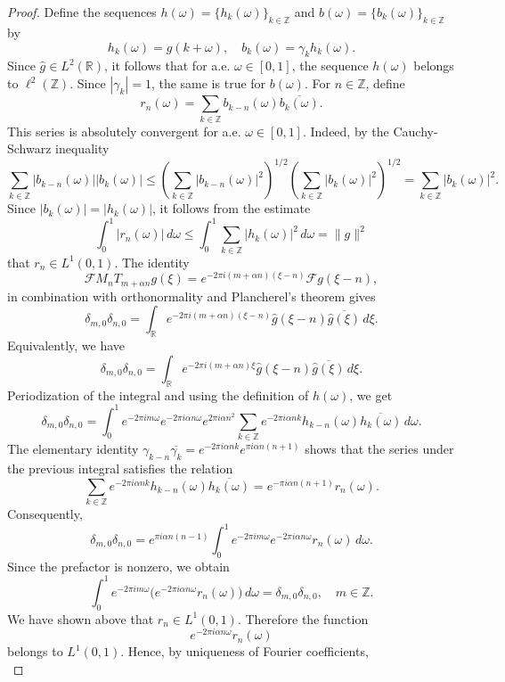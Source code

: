 \documentclass[10pt,a4paper]{amsart}
\def\Z{{\mathbb Z}}
\newcommand{\ft}{{\mathcal{F}}}
\begin{document}
\begin{proof}
Define the sequences $h(\omega)=\{h_k(\omega)\}_{k\in\Z}$ and $b(\omega)=\{b_k(\omega)\}_{k\in\Z}$ by
$$
h_k(\omega)=\widehat g(k+\omega), \quad b_k(\omega)=\gamma_k h_k(\omega).
$$
Since $\widehat g\in L^2(\mathbb R)$, it follows that for a.e. $\omega \in [0,1]$, the sequence $h(\omega)$ belongs to $\ell^2(\Z)$. Since $|\gamma_k|=1$, the same is true for $b(\omega)$.
For $n\in\mathbb Z$, define
$$
r_n(\omega) = \sum_{k\in\mathbb Z} b_{k-n}(\omega)\overline{b_k(\omega)}.
$$
This series is absolutely convergent for a.e. $\omega \in [0,1]$. Indeed, by the Cauchy-Schwarz inequality
$$
\sum_{k\in\mathbb Z} |b_{k-n}(\omega)||b_k(\omega)| \leq \left(\sum_{k\in\mathbb Z}|b_{k-n}(\omega)|^2\right)^{1/2} \left(\sum_{k\in\mathbb Z}|b_k(\omega)|^2\right)^{1/2} = \sum_{k\in\mathbb Z}|b_k(\omega)|^2.
$$
Since $|b_k(\omega)|=|h_k(\omega)|$, it follows from the estimate
$$
\int_0^1 |r_n(\omega)| \, d\omega \leq \int_0^1  \sum_{k\in\mathbb Z}|h_k(\omega)|^2 \, d\omega = \| g \|^2
$$
that $r_n \in L^1(0,1)$. The identity
$$
\ft M_nT_{m+\alpha n}g(\xi) = e^{-2\pi i(m+\alpha n)(\xi-n)} \ft g(\xi-n),
$$
in combination with orthonormality and Plancherel's theorem gives
$$
\delta_{m,0}\delta_{n,0} = \int_{\mathbb R} e^{-2\pi i(m+\alpha n)(\xi-n)} \widehat g(\xi-n)\overline{\widehat g(\xi)}\,d\xi .
$$
Equivalently, we have
$$
\delta_{m,0}\delta_{n,0} = \int_{\mathbb R} e^{-2\pi i(m+\alpha n)\xi} \widehat g(\xi-n)\overline{\widehat g(\xi)}\,d\xi .
$$
Periodization of the integral and using the definition of
$h(\omega)$, we get
$$
\delta_{m,0}\delta_{n,0} = \int_0^1 e^{-2\pi i m\omega} e^{-2\pi i\alpha n\omega} e^{2\pi i\alpha n^2} \sum_{k\in\mathbb Z} e^{-2\pi i\alpha nk} h_{k-n}(\omega)\overline{h_k(\omega)} \,d\omega .
$$
The elementary identity $\gamma_{k-n}\overline{\gamma_k} = e^{-2\pi i\alpha nk}e^{\pi i\alpha n(n+1)}$ shows that the series under the previous integral satisfies the relation
$$
\sum_{k\in\mathbb Z} e^{-2\pi i\alpha nk} h_{k-n}(\omega)\overline{h_k(\omega)} = e^{-\pi i\alpha n(n+1)}r_n(\omega).
$$
Consequently,
$$
\delta_{m,0}\delta_{n,0} = e^{\pi i\alpha n(n-1)} \int_0^1 e^{-2\pi i m\omega} e^{-2\pi i\alpha n\omega} r_n(\omega)\,d\omega.
$$
Since the prefactor is nonzero, we obtain
$$
\int_0^1 e^{-2\pi i m\omega} \bigl(e^{-2\pi i\alpha n\omega}r_n(\omega)\bigr) \,d\omega = \delta_{m,0}\delta_{n,0}, \quad  m\in\mathbb Z.
$$
We have shown above that $r_n \in L^1(0,1)$. Therefore the function
$$
e^{-2\pi i\alpha n\omega}r_n(\omega)
$$
belongs to $L^1(0,1)$. Hence, by uniqueness of Fourier coefficients,
$$
$$
\end{proof}
\end{document}
